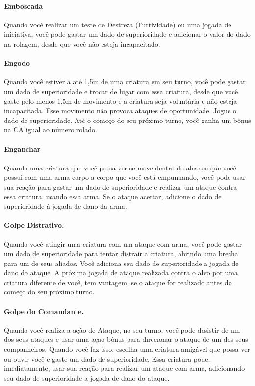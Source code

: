 \begin{multicols}{2}
\paragraph{Emboscada} Quando você realizar um teste de Destreza (Furtividade) ou
uma jogada de iniciativa, você pode gastar um dado de superioridade e adicionar
o valor do dado na rolagem, desde que você não esteja incapacitado.

\paragraph{Engodo} Quando você estiver a até 1,5m de uma criatura em seu turno,
você pode gastar um dado de superioridade e trocar de lugar com essa criatura,
desde que você gaste pelo menos 1,5m de movimento e a criatura seja voluntária e
não esteja incapacitada. Esse movimento não provoca ataques de oportunidade.
Jogue o dado de superioridade. Até o começo do seu próximo turno, você ganha um
bônus na CA igual ao número rolado.

\paragraph{Enganchar} Quando uma criatura que você possa ver se move dentro do
alcance que você possui com uma arma corpo-a-corpo que você está empunhando,
você pode usar sua reação para gastar um dado de superioridade e realizar um
ataque contra essa criatura, usando essa arma. Se o ataque acertar, adicione o
dado de superioridade à jogada de dano da arma.

\paragraph{Golpe Distrativo.} Quando você atingir uma criatura com um ataque com
arma, você pode gastar um dado de superioridade para tentar distrair a criatura,
abrindo uma brecha para um de seus aliados. Você adiciona seu dado de
superioridade a jogada de dano do ataque. A próxima jogada de ataque realizada
contra o alvo por uma criatura diferente de você, tem vantagem, se o ataque for
realizado antes do começo do seu próximo turno.

\paragraph{Golpe do Comandante.} Quando você realiza a ação de Ataque, no seu
turno, você pode desistir de um dos seus ataques e usar uma ação bônus para
direcionar o ataque de um dos seus companheiros. Quando você faz isso, escolha
uma criatura amigável que possa ver ou ouvir você e gaste um dado de
superioridade. Essa criatura pode, imediatamente, usar sua reação para realizar
um ataque com arma, adicionando seu dado de superioridade a jogada de dano do
ataque.


\end{multicols}
